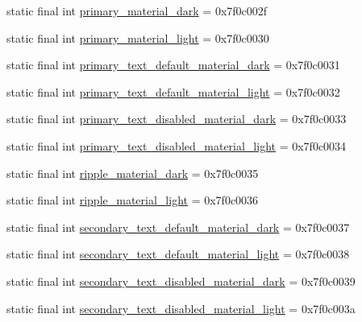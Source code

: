 \begin{CompactItemize}
\item 
static final int \hyperlink{classandroid_1_1support_1_1v7_1_1cardview_1_1_r_1_1color_13a41e605a6173d917efc6bd9c173230}{primary\_\-material\_\-dark} = 0x7f0c002f
\item 
static final int \hyperlink{classandroid_1_1support_1_1v7_1_1cardview_1_1_r_1_1color_2d9d10c4e3618cb6cd00f0905d4fe157}{primary\_\-material\_\-light} = 0x7f0c0030
\item 
static final int \hyperlink{classandroid_1_1support_1_1v7_1_1cardview_1_1_r_1_1color_ff4ade699ca1640d3cc5622c321745ee}{primary\_\-text\_\-default\_\-material\_\-dark} = 0x7f0c0031
\item 
static final int \hyperlink{classandroid_1_1support_1_1v7_1_1cardview_1_1_r_1_1color_5ddac34473f824699bef2f7427f9d00b}{primary\_\-text\_\-default\_\-material\_\-light} = 0x7f0c0032
\item 
static final int \hyperlink{classandroid_1_1support_1_1v7_1_1cardview_1_1_r_1_1color_e966222a56fabc409befd7b8e915bef4}{primary\_\-text\_\-disabled\_\-material\_\-dark} = 0x7f0c0033
\item 
static final int \hyperlink{classandroid_1_1support_1_1v7_1_1cardview_1_1_r_1_1color_13ae3ba9fdef7bf6a1eea648b70730a1}{primary\_\-text\_\-disabled\_\-material\_\-light} = 0x7f0c0034
\item 
static final int \hyperlink{classandroid_1_1support_1_1v7_1_1cardview_1_1_r_1_1color_4d9d75a9fa48e2a26c9a45e9a57866bc}{ripple\_\-material\_\-dark} = 0x7f0c0035
\item 
static final int \hyperlink{classandroid_1_1support_1_1v7_1_1cardview_1_1_r_1_1color_4d3fa98ca301f8485a358eb10492bb2a}{ripple\_\-material\_\-light} = 0x7f0c0036
\item 
static final int \hyperlink{classandroid_1_1support_1_1v7_1_1cardview_1_1_r_1_1color_bc2ffac401fc9547dc5cc513faf5ce89}{secondary\_\-text\_\-default\_\-material\_\-dark} = 0x7f0c0037
\item 
static final int \hyperlink{classandroid_1_1support_1_1v7_1_1cardview_1_1_r_1_1color_1e89423c71e243a7bec395d6f488a583}{secondary\_\-text\_\-default\_\-material\_\-light} = 0x7f0c0038
\item 
static final int \hyperlink{classandroid_1_1support_1_1v7_1_1cardview_1_1_r_1_1color_6e836274231e5cfd618e1683b3b1e24a}{secondary\_\-text\_\-disabled\_\-material\_\-dark} = 0x7f0c0039
\item 
static final int \hyperlink{classandroid_1_1support_1_1v7_1_1cardview_1_1_r_1_1color_e851398a344e1518c12c233aec133ec0}{secondary\_\-text\_\-disabled\_\-material\_\-light} = 0x7f0c003a

\end{CompactItemize}
